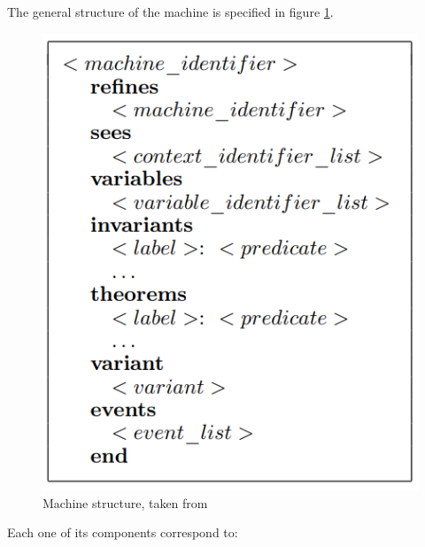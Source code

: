 The general structure of the machine is specified in figure \ref{fig:eventb3}.  
\begin{figure}[h]
    \centering
    \includegraphics[scale = 0.4]{images/eventb3.PNG}
    \caption{Machine structure, taken from \cite{Abrial2011}}
    \label{fig:eventb3}
\end{figure}
Each one of its components correspond to:
